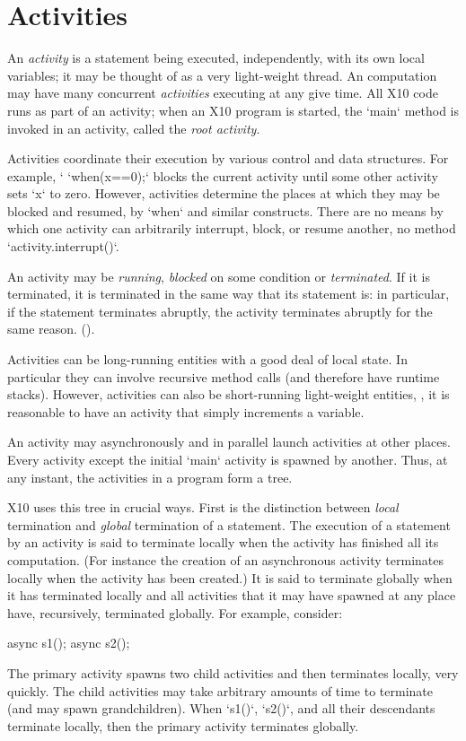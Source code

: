 \chapter{Activities}\label{XtenActivities}

An {\em activity} is a statement being executed, independently, with its own
local variables; it may be thought of as a very light-weight thread. An
\Xten{} computation may have many concurrent {\em activities} executing at any
give time.  All X10 code runs as part of an activity; when an X10 program is
started, the \xcd`main` method is invoked in an activity, called the {\em root
activity}.


Activities coordinate their execution by various control and data structures.
For example, `
\xcd`when(x==0);` blocks the current activity until some other activity
sets \xcd`x` to zero.  However, activities determine the places at which they
may be blocked and resumed, by \xcd`when` and similar constructs.  There are
no means by which one activity can arbitrarily interrupt, block, or resume
another, no method  \xcd`activity.interrupt()`.

An activity may be {\em running}, {\em blocked} on some condition or {\em
terminated}. If it is terminated, it is terminated in the same way that its
statement is: in particular, if the statement terminates abruptly, the
activity terminates abruptly for the same reason.
().

Activities can be long-running entities with a good deal of local state.  In
particular they can involve recursive method calls (and therefore have runtime
stacks).  However, activities can also be short-running light-weight entities,
\eg, it is reasonable to have an activity that simply increments a variable.

An activity may asynchronously and in parallel launch activities at
other places.  Every activity except the initial \xcd`main` activity is spawned
by another.  Thus, at any instant, the activities in a program form a tree.

X10 uses this tree in crucial ways.  
First is the distinction 
between {\em local} termination and {\em global}
termination of a statement. The execution of a statement by an
activity is said to terminate locally when the activity has finished
all its computation. (For instance the
creation of an asynchronous activity terminates locally when the
activity has been created.)  It is said to terminate globally when it
has terminated locally and all activities that it may have spawned at
any place have, recursively, terminated globally.
For example, consider: 
\begin{xten}
async {s1();}
async {s2();}
\end{xten}
The primary activity spawns two child activities and then terminates locally,
very quickly.  The child activities may take arbitrary amounts of time to
terminate (and may spawn grandchildren).  When \xcd`s1()`, \xcd`s2()`, and
all their descendants terminate locally, then the primary activity terminates
globally. 

